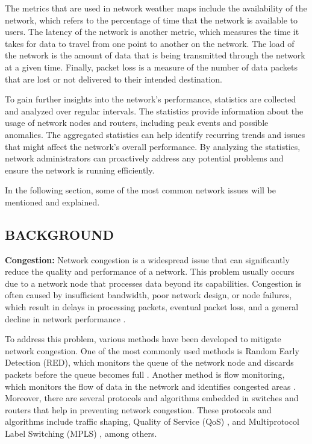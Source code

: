 \documentclass[sigconf,authorversion,nonacm]{acmart}
\begin{document}
The metrics that are used in network weather maps include the availability of the network, which refers to the percentage of time that the network is available to users. The latency of the network is another metric, which measures the time it takes for data to travel from one point to another on the network. The load of the network is the amount of data that is being transmitted through the network at a given time. Finally, packet loss is a measure of the number of data packets that are lost or not delivered to their intended destination.

To gain further insights into the network's performance, statistics are collected and analyzed over regular intervals. The statistics provide information about the usage of network nodes and routers, including peak events and possible anomalies. The aggregated statistics can help identify recurring trends and issues that might affect the network's overall performance. By analyzing the statistics, network administrators can proactively address any potential problems and ensure the network is running efficiently. 

In the following section, some of the most common network issues will be mentioned and explained. 
\subsection{BACKGROUND}
\textbf{Congestion:} Network congestion is a widespread issue that can significantly reduce the quality and performance of a network. This problem usually occurs due to a network node that processes data beyond its capabilities. Congestion is often caused by insufficient bandwidth, poor network design, or node failures, which result in delays in processing packets, eventual packet loss, and a general decline in network performance \cite{simulation}.

To address this problem, various methods have been developed to mitigate network congestion. One of the most commonly used methods is Random Early Detection (RED), which monitors the queue of the network node and discards packets before the queue becomes full \cite{10.1145/263105.263154}. Another method is flow monitoring, which monitors the flow of data in the network and identifies congested areas \cite{10.1145/3342280.3342305}. Moreover, there are several protocols and algorithms embedded in switches and routers that help in preventing network congestion. These protocols and algorithms include traffic shaping, Quality of Service (QoS) \cite{VanMieghem2003}, and Multiprotocol Label Switching (MPLS) \cite{Conte2003}, among others.
\end{document}

